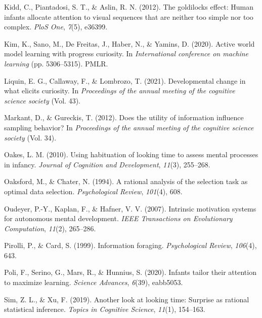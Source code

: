 \documentclass[10pt, letterpaper]{article}
\newenvironment{CSLReferences}%
  {}%
  {\par}
\begin{document}
\begin{CSLReferences}
\leavevmode{}%
Kidd, C., Piantadosi, S. T., \& Aslin, R. N. (2012). The goldilocks
effect: Human infants allocate attention to visual sequences that are
neither too simple nor too complex. \emph{PloS One}, \emph{7}(5),
e36399.

\leavevmode{}%
Kim, K., Sano, M., De Freitas, J., Haber, N., \& Yamins, D. (2020).
Active world model learning with progress curiosity. In
\emph{International conference on machine learning} (pp. 5306--5315).
PMLR.

\leavevmode{}%
Liquin, E. G., Callaway, F., \& Lombrozo, T. (2021). Developmental
change in what elicits curiosity. In \emph{Proceedings of the annual
meeting of the cognitive science society} (Vol. 43).

\leavevmode{}%
Markant, D., \& Gureckis, T. (2012). Does the utility of information
influence sampling behavior? In \emph{Proceedings of the annual meeting
of the cognitive science society} (Vol. 34).

\leavevmode{}%
Oakes, L. M. (2010). Using habituation of looking time to assess mental
processes in infancy. \emph{Journal of Cognition and Development},
\emph{11}(3), 255--268.

\leavevmode{}%
Oaksford, M., \& Chater, N. (1994). A rational analysis of the selection
task as optimal data selection. \emph{Psychological Review},
\emph{101}(4), 608.

\leavevmode{}%
Oudeyer, P.-Y., Kaplan, F., \& Hafner, V. V. (2007). Intrinsic
motivation systems for autonomous mental development. \emph{IEEE
Transactions on Evolutionary Computation}, \emph{11}(2), 265--286.

\leavevmode{}%
Pirolli, P., \& Card, S. (1999). Information foraging.
\emph{Psychological Review}, \emph{106}(4), 643.

\leavevmode{}%
Poli, F., Serino, G., Mars, R., \& Hunnius, S. (2020). Infants tailor
their attention to maximize learning. \emph{Science Advances},
\emph{6}(39), eabb5053.

\leavevmode{}%
Sim, Z. L., \& Xu, F. (2019). Another look at looking time: Surprise as
rational statistical inference. \emph{Topics in Cognitive Science},
\emph{11}(1), 154--163.


\end{CSLReferences}
\end{document}
